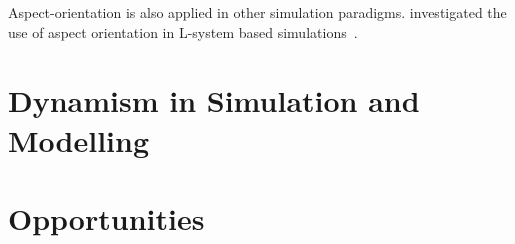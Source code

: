 Aspect-orientation is also applied in other simulation paradigms.
\citeauthor{Cieslak_2011} investigated the use of aspect orientation in L-system
based simulations~\cite{Cieslak_2011}.




\section{Dynamism in Simulation and Modelling}





\section{Opportunities}

